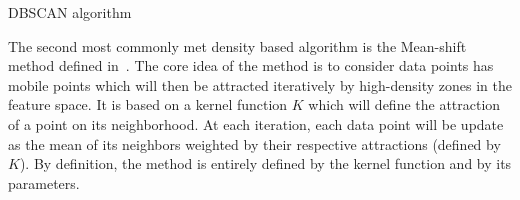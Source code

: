 \begin{algorithm}
    \caption{DBSCAN algorithm}
\label{alg:dbscan}

    \end{algorithm}

    The second most commonly met density based algorithm is the Mean-shift method defined in~\cite{cheng1995mean}. The core idea of the method is to consider data points has mobile points which will then be attracted iteratively by high-density zones in the feature space. It is based on a kernel function $K$ which will define the attraction of a point on its neighborhood. At each iteration, each data point will be update as the mean of its neighbors weighted by their respective attractions (defined by $K$). By definition, the method is entirely defined by the kernel function and by its parameters.

